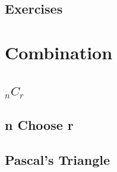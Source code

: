 \subsection{Exercises}

\newpage
\section{Combination}
\noindent{}
\subsection{$_nC_r$}
\subsection{n Choose r}
\subsection{Pascal's Triangle}
